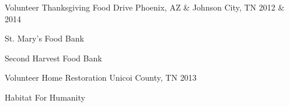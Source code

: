 \begin{cventries}
\cventry
    {Volunteer}
    {Thanksgiving Food Drive}
    {Phoenix, AZ \& Johnson City, TN}
    {2012 \& 2014}
    {\begin{cvitems}
        \item {St. Mary's Food Bank}
        \item {Second Harvest Food Bank}
      \end{cvitems}}

\cventry
    {Volunteer}
    {Home Restoration}
    {Unicoi County, TN}
    {2013}
    {\begin{cvitems}
        \item {Habitat For Humanity}
      \end{cvitems}}

\end{cventries}